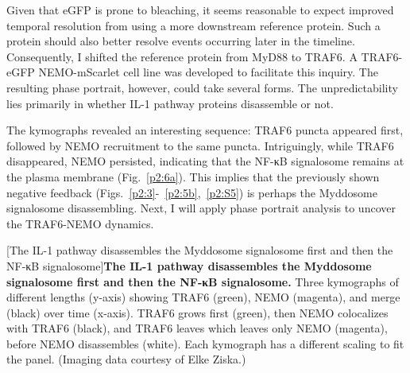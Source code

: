 Given that eGFP is prone to bleaching, it seems reasonable to expect improved temporal resolution from using a more downstream reference protein. Such a protein should also better resolve events occurring later in the timeline. Consequently, I shifted the reference protein from MyD88 to TRAF6. A TRAF6-eGFP NEMO-mScarlet cell line was developed to facilitate this inquiry. The resulting phase portrait, however, could take several forms. The unpredictability lies primarily in whether IL-1 pathway proteins disassemble or not.

The kymographs revealed an interesting sequence: TRAF6 puncta appeared first, followed by NEMO recruitment to the same puncta. Intriguingly, while TRAF6 disappeared, NEMO persisted, indicating that the NF-κB signalosome remains at the plasma membrane (Fig.~\ref{p2:6a}). This implies that the previously shown negative feedback (Figs.~\ref{p2:3}-~\ref{p2:5b},~\ref{p2:S5}) is perhaps the Myddosome signalosome disassembling. Next, I will apply phase portrait analysis to uncover the TRAF6-NEMO dynamics.


\begin{centering}
\captionsetup{parbox=none}
[The IL-1 pathway disassembles the Myddosome signalosome first and then the NF-κB signalosome]{\textbf{The IL-1 pathway disassembles the Myddosome signalosome first and then the NF-κB signalosome.} Three kymographs of different lengths (y-axis) showing TRAF6 (green), NEMO (magenta), and merge (black) over time (x-axis). TRAF6 grows first (green), then NEMO colocalizes with TRAF6 (black), and TRAF6 leaves which leaves only NEMO (magenta), before NEMO disassembles (white). Each kymograph has a different scaling to fit the panel. (Imaging data courtesy of Elke Ziska.)}
\label{p2:6a}
\end{centering}

